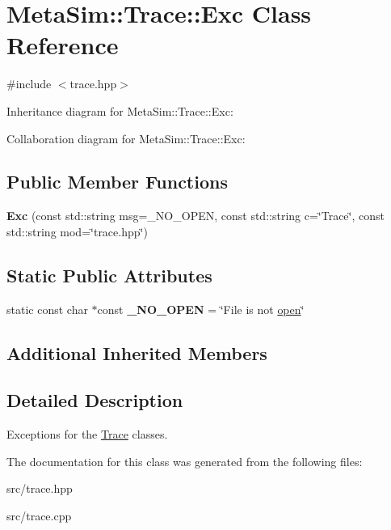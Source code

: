 \hypertarget{classMetaSim_1_1Trace_1_1Exc}{}\section{Meta\+Sim\+:\+:Trace\+:\+:Exc Class Reference}
\label{classMetaSim_1_1Trace_1_1Exc}


{\ttfamily \#include $<$trace.\+hpp$>$}



Inheritance diagram for Meta\+Sim\+:\+:Trace\+:\+:Exc\+:


Collaboration diagram for Meta\+Sim\+:\+:Trace\+:\+:Exc\+:
\subsection*{Public Member Functions}
\begin{DoxyCompactItemize}
\item 
{\bfseries Exc} (const std\+::string msg=\+\_\+\+N\+O\+\_\+\+O\+P\+EN, const std\+::string c=\char`\"{}Trace\char`\"{}, const std\+::string mod=\char`\"{}trace.\+hpp\char`\"{})\hypertarget{classMetaSim_1_1Trace_1_1Exc_a316a8665b71bc963b521fa7bcfa5035a}{}\label{classMetaSim_1_1Trace_1_1Exc_a316a8665b71bc963b521fa7bcfa5035a}

\end{DoxyCompactItemize}
\subsection*{Static Public Attributes}
\begin{DoxyCompactItemize}
\item 
static const char $\ast$const {\bfseries \+\_\+\+N\+O\+\_\+\+O\+P\+EN} = \char`\"{}File is not \hyperlink{classMetaSim_1_1Trace_a9f2815326488c04359602ec51e42c20b}{open}\char`\"{}\hypertarget{classMetaSim_1_1Trace_1_1Exc_a9d96b0cea1e39ab4e1c1d58650113183}{}\label{classMetaSim_1_1Trace_1_1Exc_a9d96b0cea1e39ab4e1c1d58650113183}

\end{DoxyCompactItemize}
\subsection*{Additional Inherited Members}


\subsection{Detailed Description}
Exceptions for the \hyperlink{classMetaSim_1_1Trace}{Trace} classes. 

The documentation for this class was generated from the following files\+:\begin{DoxyCompactItemize}
\item 
src/trace.\+hpp\item 
src/trace.\+cpp\end{DoxyCompactItemize}
